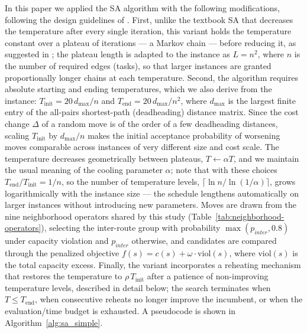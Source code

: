 In this paper we applied the SA algorithm with the following modifications,
following the design guidelines of \cite{taillardDesignHeuristicAlgorithms2023}.
First, unlike the textbook SA that decreases the temperature after every
single iteration, this variant holds the temperature constant over a plateau
of iterations --- a Markov chain --- before reducing it, as suggested in
\cite{taillardDesignHeuristicAlgorithms2023}; the plateau length is adapted
to the instance as $L = n^2$, where $n$ is the number of required edges
(tasks), so that larger instances are granted proportionally longer chains
at each temperature. Second, the algorithm requires absolute starting and
ending temperatures, which we also derive from the instance:
$T_{\mathrm{init}} = 20\, d_{\mathrm{max}}/n$ and
$T_{\mathrm{end}} = 20\, d_{\mathrm{max}}/n^{2}$, where $d_{\mathrm{max}}$
is the largest finite entry of the all-pairs shortest-path (deadheading)
distance matrix. Since the cost change $\Delta$ of a random move is of the
order of a few deadheading distances, scaling $T_{\mathrm{init}}$ by
$d_{\mathrm{max}}/n$ makes the initial acceptance probability of worsening
moves comparable across instances of very different size and cost scale.
The temperature decreases geometrically between plateaus,
$T \leftarrow \alpha T$, and we maintain the usual meaning of the cooling
parameter $\alpha$; note that with these choices
$T_{\mathrm{end}}/T_{\mathrm{init}} = 1/n$, so the number of temperature
levels, $\lceil \ln n / \ln(1/\alpha) \rceil$, grows logarithmically with
the instance size --- the schedule lengthens automatically on larger
instances without introducing new parameters. Moves are drawn from the nine
neighborhood operators shared by this study
(Table~\ref{tab:neighborhood-operators}), selecting the inter-route group
with probability $\max(p_{inter}, 0.8)$ under capacity violation and
$p_{inter}$ otherwise, and candidates are compared through the penalized
objective $f(s) = c(s) + \omega \cdot \mathrm{viol}(s)$, where
$\mathrm{viol}(s)$ is the total capacity excess. Finally, the variant
incorporates a reheating mechanism that restores the temperature to
$\rho\, T_{\mathrm{init}}$ after a patience of non-improving temperature
levels, described in detail below; the search terminates when
$T \leq T_{\mathrm{end}}$, when consecutive reheats no longer improve the
incumbent, or when the evaluation/time budget is exhausted. A pseudocode is
shown in Algorithm~\ref{alg:sa_simple}.
